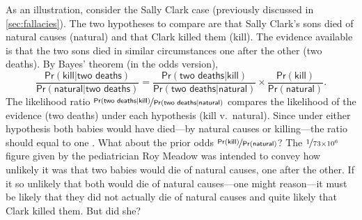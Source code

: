 \documentclass{article}
\newcommand{\pr}{\mathsf{Pr}}
\begin{document}
%


As an illustration, consider the Sally Clark case (previously discussed in \ref{sec:fallacies}). 
The two hypotheses to compare are that Sally Clark's sons 
died of natural causes (\textsf{natural}) and that  Clark killed them (\textsf{kill}). The evidence available is that 
the two sons died in similar circumstances one after the other (\textsf{two deaths}).
By Bayes' theorem (in the odds version),
%
\[
 \frac{\pr(\textsf{kill} \vert \textsf{two deaths})}{\pr(\textsf{natural} \vert \textsf{two deaths})} = 
 \frac{\pr(\textsf{two deaths} \vert \textsf{kill})}{\pr(\textsf{two deaths} \vert \textsf{natural})} 
 \times 
 \frac{\pr(\textsf{kill})}{\pr(\textsf{natural})}.
\]
%
The likelihood ratio $ \nicefrac{\pr(\textsf{two deaths} \vert \textsf{kill})}{\pr(\textsf{two deaths} \vert \textsf{natural})}$ 
compares the likelihood of the evidence (\textsf{two deaths}) under each hypothesis (\textsf{kill} v.\ \textsf{natural}). 
Since under either hypothesis both babies would have died---by 
natural causes or killing---the ratio should equal to one \citep{Dawid02}. %
What about 
the prior odds $\nicefrac{\pr(\textsf{kill})}{\pr(\textsf{natural})}$? 
The $\nicefrac{1}{73\times 10^6}$ figure given by the pediatrician Roy Meadow was intended to convey how unlikely it was that two babies would die of natural causes, one after the other. If it so unlikely that both would die of natural causes---one might reason---it must be likely that they did not actually die of natural causes and 
quite likely that Clark killed them. But did she? 
\end{document}

